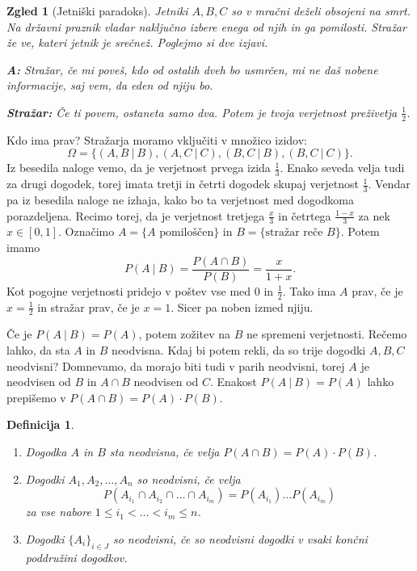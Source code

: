 \documentclass[10pt, a4paper]{article}
\newtheorem{defi}[izr]{Definicija}
\newenvironment{noticeB}{%
  \tcolorbox[%
  notitle,
  empty,
  enhanced,  %
  breakable,
  coltext=black,
  colback=white, 
  fontupper=\rmfamily,
  noparskip,
  sharp corners,
  boxrule=-1pt,  %
  frame hidden,
  left=7pt,  %
  right=7pt,
  top=5pt,
  bottom=5pt,
  before skip=2.5ex plus 2pt,
  after skip=2.5ex plus 2pt,
  borderline west = {1.5pt}{-0.1pt}{blue!30!black}, %
  overlay unbroken and last={%
    \draw[color=black, line width=1.25pt]
    ($(frame.south west)+(1.pt, -0.1pt)$) -- ++(2em, 0);
  }
  ]}
{\endtcolorbox}
\newenvironment{definicija}{\begin{noticeB}\begin{defi}}{%
    \end{defi}\end{noticeB}}
\newtheorem{zgled}[izr]{Zgled}
\begin{document}
\begin{zgled}[Jetniški paradoks]
  Jetniki $A, B, C$ so v mračni deželi obsojeni na smrt. Na državni praznik vladar naključno izbere enega od njih in ga pomilosti.
  Stražar že ve, kateri jetnik je srečnež. Poglejmo si dve izjavi.

  \textbf{A:} Stražar, če mi poveš, kdo od ostalih dveh bo usmrčen, mi ne daš nobene informacije, saj vem, da eden od njiju bo.

  \textbf{Stražar:} Če ti povem, ostaneta samo dva. Potem je tvoja verjetnost preživetja $\frac{1}{2}$.  
\end{zgled}
Kdo ima prav?
Stražarja moramo vključiti v množico izidov:
$$\Omega = \{(A, B\ |\ B), (A, C\ |\ C), (B, C\ |\ B), (B, C\ |\ C)\}.$$
Iz besedila naloge vemo, da je verjetnost prvega izida $\frac{1}{3}$.
Enako seveda velja tudi za drugi dogodek, torej imata tretji in četrti dogodek skupaj verjetnost $\frac{1}{3}$.
Vendar pa iz besedila naloge ne izhaja, kako bo ta verjetnost med dogodkoma porazdeljena.
Recimo torej, da je verjetnost tretjega $\frac{x}{3}$ in četrtega $\frac{1 - x}{3}$ za nek $x \in [0, 1]$.
Označimo $A = \{\text{$A$ pomiloščen}\}$ in $B = \{\text{stražar reče $B$}\}$. Potem imamo 
$$P(A\ |\ B) = \frac{P(A \cap B)}{P(B)} = \frac{x}{1 + x}.$$
Kot pogojne verjetnosti pridejo v poštev vse med $0$ in $\frac{1}{2}$.
Tako ima $A$ prav, če je $x = \frac{1}{2}$ in stražar prav, če je $x = 1$.
Sicer pa noben izmed njiju.

Če je $P(A\ |\ B) = P(A)$, potem zožitev na $B$ ne spremeni verjetnosti.
Rečemo lahko, da sta $A$ in $B$ neodvisna. Kdaj bi potem rekli, da so trije dogodki 
$A, B, C$ neodvisni? Domnevamo, da morajo biti tudi v parih neodvisni, torej $A$ je neodvisen od $B$ in 
$A \cap B$ neodvisen od $C$. Enakost $P(A\ |\ B) = P(A)$ lahko prepišemo v $P(A \cap B) = P(A) \cdot P(B)$.

\begin{definicija}
  \begin{enumerate}
    \item Dogodka $A$ in $B$ sta neodvisna, če velja $P(A \cap B) = P(A) \cdot P(B)$.
    \item Dogodki $A_1, A_2, \dots, A_n$ so neodvisni, če velja
    $$P(A_{i_1} \cap A_{i_2} \cap \dots \cap A_{i_m}) = P(A_{i_1}) \dots P(A_{i_m})$$
    za vse nabore $1 \leq i_1 < \dots < i_m \leq n$.
    \item Dogodki $\{A_i\}_{i \in J}$ so neodvisni, če so neodvisni dogodki v vsaki končni poddružini dogodkov.
  \end{enumerate}
\end{definicija}
\end{document}
